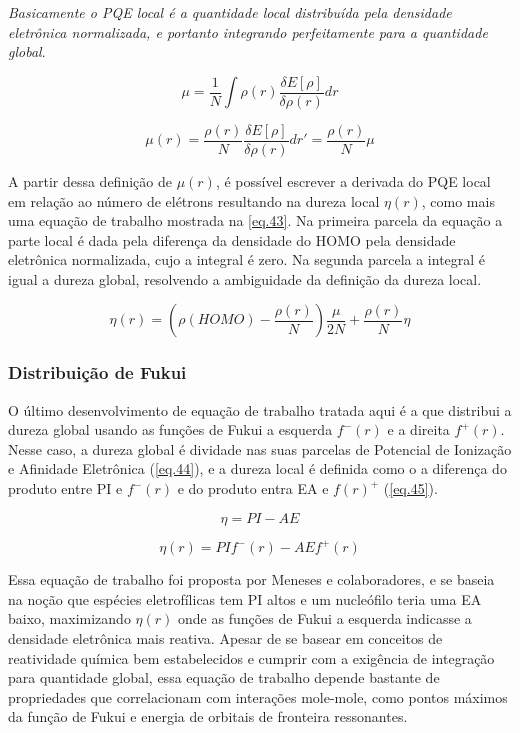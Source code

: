 \documentclass[a4paper,11pt]{refart}
\begin{document}
\emph{Basicamente o PQE local é a quantidade local distribuída pela densidade eletrônica normalizada, e portanto integrando perfeitamente para a quantidade global}. 


\begin{equation}
\mu = \frac{1}{N} \int \rho(r) \frac{\delta E[\rho]}{\delta \rho(r)} dr
\label{eq.41}
\end{equation}

\begin{equation}
\mu(r) =  \frac{\rho(r)}{N} \frac{\delta E[\rho]}{\delta \rho(r)} dr'  = \frac{\rho(r)}{N} \mu
\label{eq.42}
\end{equation}

A partir dessa definição de $\mu(r)$, é possível escrever a derivada do PQE local em relação ao número de elétrons resultando na dureza local $\eta(r)$, como mais uma equação de trabalho mostrada na \autoref{eq.43}. Na primeira parcela da equação a parte local é dada pela diferença da densidade do HOMO pela densidade eletrônica normalizada, cujo a integral é zero. Na segunda parcela a integral é igual a dureza global, resolvendo a ambiguidade da definição da dureza local. 

\begin{equation}
\eta(r) = \left (\rho(HOMO) - \frac{\rho(r)}{N} \right) \frac{\mu}{2N} + \frac{\rho(r)}{N}\eta
\label{eq.43}
\end{equation}

\subsubsection{Distribuição de Fukui}

O último desenvolvimento de equação de trabalho tratada aqui é a que distribui a dureza global usando as funções de Fukui a esquerda $f^-(r)$ e a direita $f^+(r)$. Nesse caso, a dureza global é dividade nas suas parcelas de Potencial de Ionização e Afinidade Eletrônica (\autoref{eq.44}), e a dureza local é definida como o a diferença do produto entre PI e $f^-(r)$ e do produto entra EA e $f(r)^+$ (\autoref{eq.45}).

\begin{equation}
\eta = PI - AE
\label{eq.44} 
\end{equation}

\begin{equation}
\eta(r) = PI f^-(r) - AE f^+(r)
\label{eq.45} 
\end{equation}

Essa equação de trabalho foi proposta por Meneses e colaboradores\cite{meneses2004proposal}, e se baseia na noção que espécies eletrofílicas tem PI altos e um nucleófilo teria uma EA baixo, maximizando $\eta(r)$ onde as funções de Fukui a esquerda indicasse a densidade eletrônica mais reativa. Apesar de se basear em conceitos de reatividade química bem estabelecidos e cumprir com a exigência de integração para quantidade global, essa equação de trabalho depende bastante de propriedades que correlacionam com interações mole-mole, como pontos máximos da função de Fukui e energia de orbitais de fronteira ressonantes. 
\end{document}
